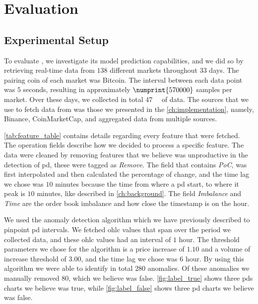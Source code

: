 
\chapter{Evaluation}\label{ch:evaluation}\glsresetall
\section{Experimental Setup}\label{sec:experimental_setup}
To evaluate \project, we investigate its model prediction capabilities, and we did so by retrieving real-time data from $138$ different markets throughout $33$ days. The pairing coin of each market was Bitcoin. The interval between each data point was $5$ seconds, resulting in approximately $\numprint{570 000}$ samples per market. Over these days, we collected in total \SI{47}{\giga\byte} of data. The sources that we use to fetch data from was those we presented in the \autoref{ch:implementation}, namely, Binance, CoinMarketCap, and aggregated data from multiple sources. 

\autoref{tab:feature_table} contains details regarding every feature that were fetched. The operation fields describe how we decided to process a specific feature. The data were cleaned by removing features that we believe was unproductive in the detection of \ac{pd}, these were tagged as \emph{Remove}. The field that contains \emph{PoC}, was first interpolated and then calculated the percentage of change, and the time lag we chose was $10$ minutes because the time from where a \ac{pd} start, to where it peak is $10$ minutes, like described in \autoref{ch:background}. The field \emph{Imbalance} and \emph{Time} are the order book imbalance and how close the timestamp is on the hour.



We used the anomaly detection algorithm which we have previously described to pinpoint \ac{pd} intervals. We fetched \ac{ohlc} values that span over the period we collected data, and these \ac{ohlc} values had an interval of $1$ hour. The threshold parameters we chose for the algorithm is a price increase of $1.10$ and a volume of increase threshold of $3.00$, and the time lag we chose was $6$ hour. By using this algorithm we were able to identify in total $280$ anomalies. Of these anomalies we manually removed $80$, which we believe was false. \autoref{fig:label_true} shows three \acp{pd} charts we believe was true, while \autoref{fig:label_false} shows three \ac{pd} charts we believe was false.

